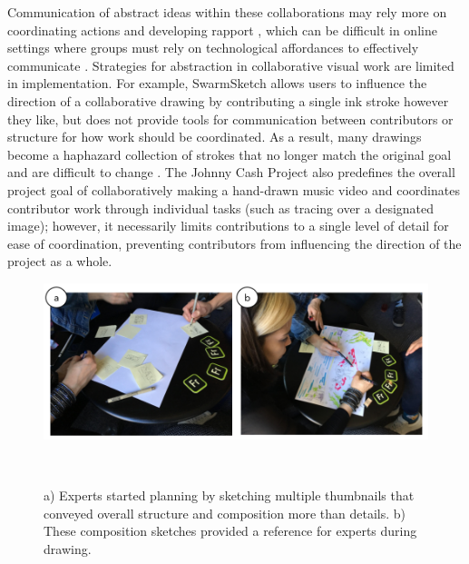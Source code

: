 Communication of abstract ideas within these collaborations may rely more on coordinating actions and developing rapport \cite{Davis2017,Davis2016}, which can be difficult in online settings where groups must rely on technological affordances to effectively communicate \cite{Hollan1992,Jensen2018}. Strategies for abstraction in collaborative visual work are limited in implementation. For example, SwarmSketch \cite{swarm} allows users to influence the direction of a collaborative drawing by contributing a single ink stroke however they like, but does not provide tools for communication between contributors or structure for how work should be coordinated. As a result, many drawings become a haphazard collection of strokes that no longer match the original goal and are difficult to change \cite{Boxer2005}. The Johnny Cash Project \cite{TheJohnnyCashProject2012} also predefines the overall project goal of collaboratively making a hand-drawn music video and coordinates contributor work through individual tasks (such as tracing over a designated image); however, it necessarily limits contributions to a single level of detail for ease of coordination, preventing contributors from influencing the direction of the project as a whole. 

\begin{figure}
\centering
\includegraphics[width=\textwidth]{abstraction/figures/expert.png}
\vspace{-0.2in}
  \caption{a) Experts started planning by sketching multiple thumbnails that conveyed overall structure and composition more than details. b) These composition sketches provided a reference for experts during drawing.}
  ~\label{fig:expert}
  \vspace{-0.2in}
\end{figure}

